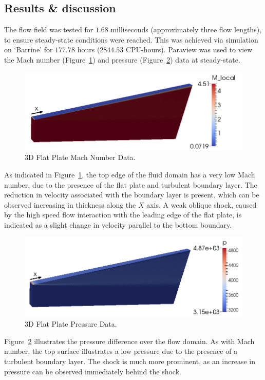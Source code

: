 \clearpage
\subsection{Results \& discussion}
The flow field was tested for $1.68$ milliseconds (approximately three flow lengths), to ensure steady-state conditions were reached. This was achieved via simulation on `Barrine' for $177.78$ hours ($2844.53$ CPU-hours). Paraview was used to view the Mach number (Figure~\ref{f:tc1:mach}) and pressure (Figure~\ref{f:tc1:pressure}) data at steady-state.
%
\begin{figure}[htbp]
 \begin{center}
  \includegraphics[width=16cm]{./chap6-3Dflatplate/figs/testcase1mach2.png}
  \caption{3D Flat Plate Mach Number Data.}
  \label{f:tc1:mach}
 \end{center}
\end{figure}
%

As indicated in Figure~\ref{f:tc1:mach}, the top edge of the fluid domain has a very low Mach number, due to the presence of the flat plate and turbulent boundary layer. The reduction in velocity associated with the boundary layer is present, which can be observed increasing in thickness along the $X$ axis.
A weak oblique shock, caused by the high speed flow interaction with the leading edge of the flat plate, is indicated as a slight change in velocity parallel to the bottom  boundary.
%
\begin{figure}[htbp]
 \begin{center}
  \includegraphics[width=16cm]{./chap6-3Dflatplate/figs/testcase1pressure2.png}
  \caption{3D Flat Plate Pressure Data.}
  \label{f:tc1:pressure}
 \end{center}
\end{figure}
%
Figure~\ref{f:tc1:pressure} illustrates the pressure difference over the flow domain. As with Mach number, the top surface illustrates a low pressure due to the presence of a turbulent boundary layer. The shock is much more prominent, as an increase in pressure can be observed immediately behind the shock.

